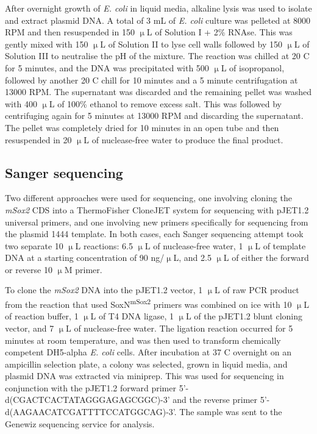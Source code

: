 \documentclass[withindex,glossary]{cam-thesis}
\begin{document}
After overnight growth of \emph{E. coli} in liquid media, alkaline lysis
was used to isolate and extract plasmid DNA. A total of 3 mL of \emph{E.
coli} culture was pelleted at 8000 RPM and then resuspended in 150 $\upmu{}$L of
Solution I + 2\% RNAse. This was gently mixed with 150 $\upmu{}$L of Solution II
to lyse cell walls followed by 150 $\upmu{}$L of Solution III to neutralise the
pH of the mixture. The reaction was chilled at \textminus{}20 \textdegree{}C for 5 minutes, and
the DNA was precipitated with 500 $\upmu{}$L of isopropanol, followed by another
\textminus{}20 \textdegree{}C chill for 10 minutes and a 5 minute centrifugation at 13000 RPM.
The supernatant was discarded and the remaining pellet was washed with
400 $\upmu{}$L of 100\% ethanol to remove excess salt. This was followed by
centrifuging again for 5 minutes at 13000 RPM and discarding the
supernatant. The pellet was completely dried for 10 minutes in an open
tube and then resuspended in 20 $\upmu{}$L of nuclease-free water to produce the
final product.

\subsection{Sanger sequencing}

Two different approaches were used for sequencing, one involving cloning
the \emph{mSox2} CDS into a ThermoFisher CloneJET system for sequencing
with pJET1.2 universal primers, and one involving new primers
specifically for sequencing from the plasmid 1444 template. In both
cases, each Sanger sequencing attempt took two separate 10 $\upmu{}$L reactions:
6.5 $\upmu{}$L of nuclease-free water, 1 $\upmu{}$L of template DNA at a starting
concentration of 90 ng/$\upmu{}$L, and 2.5 $\upmu{}$L of either the forward or reverse
10 $\upmu{}$M primer.

To clone the \emph{mSox2} DNA into the pJET1.2 vector, 1 $\upmu{}$L of raw PCR
product from the reaction that used SoxN\textsuperscript{mSox2} primers
was combined on ice with 10 $\upmu{}$L of reaction buffer, 1 $\upmu{}$L of T4 DNA
ligase, 1 $\upmu{}$L of the pJET1.2 blunt cloning vector, and 7 $\upmu{}$L of
nuclease-free water. The ligation reaction occurred for 5 minutes at
room temperature, and was then used to transform chemically competent
DH5-alpha \emph{E. coli} cells. After incubation at 37 \textdegree{}C overnight on
an ampicillin selection plate, a colony was selected, grown in liquid
media, and plasmid DNA was extracted via miniprep. This was used for
sequencing in conjunction with the pJET1.2 forward primer
5'-d(CGACTCACTATAGGGAGAGCGGC)-3' and the reverse primer
5'-d(AAGAACATCGATTTTCCATGGCAG)-3'. The sample was sent to the Genewiz
sequencing service for analysis.
\end{document}
